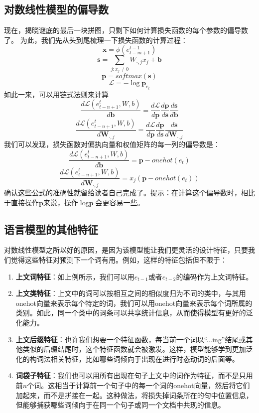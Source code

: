 \documentclass[10pt,a4paper]{ctexart}
\begin{document}
\subsection{对数线性模型的偏导数}
现在，揭晓谜底的最后一块拼图，只剩下如何计算损失函数的每个参数的偏导数了。
为此，我们先从头到尾梳理一下损失函数的计算过程：
\[
 \textbf{x} = \phi (e_{t-m+1}^{t-1})
\]
\[
  \textbf{s} = \sum_{j:x_j \neq 0} W_{\cdot,j}x_j + \textbf{b}
\]
\[
 \textbf{p} = softmax(\textbf{s})
\]
\[
 \mathcal{L} = - \log \textbf{p}_{e_t}
\]
如此一来，可以用链式法则来计算
\[
 \frac{d\mathcal{L}(e_{t-n+1}^t,W,b)}{d\textbf{b}} = \frac{d\mathcal{L}}{d\textbf{p}}\frac{d\textbf{p}}{d\textbf{s}}\frac{d\textbf{s}}{d\textbf{b}}
\]
\[
 \frac{d\mathcal{L}(e_{t-n+1}^t,W,b)}{d\textbf{W}_{\cdot,j}} = \frac{d\mathcal{L}}{d\textbf{p}}\frac{d\textbf{p}}{d\textbf{s}}\frac{d\textbf{s}}{d\textbf{W}_{\cdot,j}}
\]
我们可以发现，损失函数对偏执向量和权值矩阵的每一列的偏导数是：
\[
 \frac{d\mathcal{L}(e_{t-n+1}^t,W,b)}{d\textbf{b}} = \textbf{p} - onehot(e_t)
\]
\[
 \frac{d\mathcal{L}(e_{t-n+1}^t,W,b)}{d\textbf{W}_{\cdot,j}} = x_j (\textbf{p} - onehot(e_t))
\]
确认这些公式的准确性就留给读者自己完成了。提示：在计算这个偏导数时，相比于直接操作$\textbf{p}$来说，操作$\log \textbf{p}$会更容易一些。

\subsection{语言模型的其他特征}
对数线性模型之所以好的原因，是因为该模型能让我们更灵活的设计特征，只要我们觉得这些特征对预测下一个词有用。例如，这样的特征包括但不限于：
\begin{enumerate}
\item[] \textbf{上文词特征}：如上例所示，我们可以用$e_{t-1}$或者$e_{t-2}$的编码作为上文词特征。
\item[] \textbf{上文类特征}：上文中的词可以按相互之间的相似度归为不同的类中，与其用onehot向量来表示每个特定的词，我们可以用onehot向量来表示每个词所属的类别。如此，同一个类中的词条可以共享统计信息，从而使得模型有更好的泛化能力。
\item[] \textbf{上文后缀特征}：也许我们想要一个特征函数，每当前一个词以“...ing”结尾或其他类似的后缀结尾时，这个特征函数就会被激发。这样，模型能够学到更加泛化的构词法相关特征，比如哪些词倾向于出现在进行时态动词的后面等。
\item[] \textbf{词袋子特征}：我们也可以用所有出现在句子上文中的词作为特征，而不是只用前$n$个词。这相当于计算前一个句子中的每一个词的onehot向量，然后将它们加起来，而不是拼接在一起。这种做法，将损失掉词条所在的句中位置信息，但能够捕获哪些词倾向于在同一个句子或同一个文档中共现的信息。
\end{enumerate}
\end{document}

